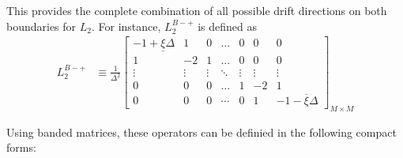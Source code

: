 \documentclass[11pt]{article}
\theoremstyle{definition}
\begin{document}
This provides the complete combination of all possible drift directions on both boundaries for $L_2$. For instance, $L_2^{B-+}$ is defined as
\begin{align}
L_2^{B-+} &\equiv \frac{1}{\Delta^2}\begin{bmatrix}
-1 + \underline{\xi}\Delta &1&0&\dots&0&0&0\\
1&-2&1&\dots&0&0&0\\
\vdots&\vdots&\vdots&\ddots&\vdots&\vdots&\vdots\\
0&0&0&\dots&1&-2&1\\
0&0&0&\cdots&0&1&-1 - \overline{\xi}\Delta
\end{bmatrix}_{M\times M}
\end{align}

Using banded matrices, these operators can be definied in the following compact forms:
\end{document}
